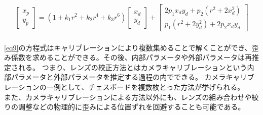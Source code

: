 \begin{eqnarray}
\label{eq9}
\left[ \begin{array}{l}
x_{p} \\
y_{p}
\end{array} \right]
=(1+k_1 r^2+k_2 r^4+k_3 r^6)
\left[\begin{array}{l}
x_{d} \\
y_{d}
\end{array} \right]
+
\left[ \begin{array}{l}
  2p_1x_dy_d + p_2 (r^2 + 2x_d^2)  \\
  p_1(r^2+2y_d^2) + 2p_2x_dy_d
\end{array} \right]
\end{eqnarray}\\
\eqref{eq9}の方程式はキャリブレーションにより複数集めることで解くことができ、歪み係数を求めることができる。その後、内部パラメータや外部パラメータは再推定される。
つまり、レンズの校正方法とはカメラキャリブレーションという内部パラメータと外部パラメータを推定する過程の内でできる。
カメラキャリブレーションの一例として、チェスボードを複数枚とった方法が挙げられる。\\
また、カメラキャリブレーションによる方法以外にも、レンズの組み合わせや絞りの調整などの物理的に歪みによる位置ずれを回避することも可能である。